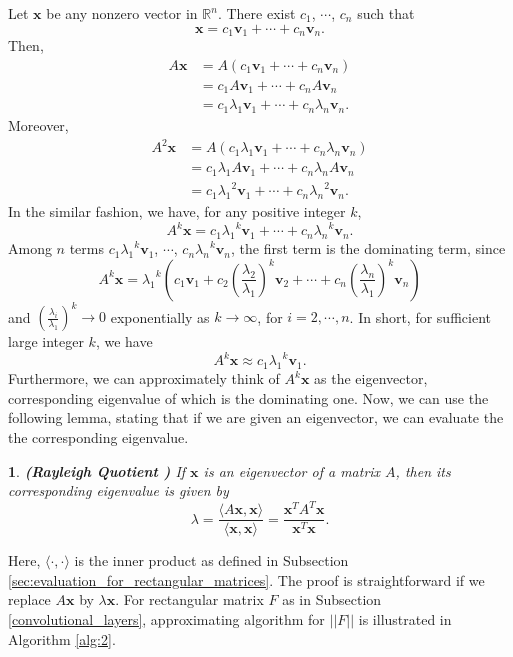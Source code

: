 \documentclass[12pt]{report}
\numberwithin{figure}{chapter}
\theoremstyle{plain}
\theoremstyle{definition}
\theoremstyle{corollary}
\theoremstyle{definition}
\theoremstyle{plain}
\theoremstyle{definition}
\theoremstyle{plain}
\newtheorem{lemma}[theorem]{\protect\lemmaname}
\providecommand{\lemmaname}{Lemma}
\newcommand\bx{\ensuremath{\boldsymbol x}}
\newcommand\bv{\ensuremath{\boldsymbol v}}
\begin{document}
Let \(\bx\) be any nonzero vector in \(\mathbb R^n\).
There exist \(c_1\), \(\cdots\), \(c_n\) such that
\[\bx=c_1\bv_1+\cdots+c_n\bv_n.\]
Then,
\begin{align*}
A\bx
&=A(c_1\bv_1+\cdots+c_n\bv_n)\\
&=c_1A\bv_1+\cdots+c_nA\bv_n\\
&=c_1\lambda_1\bv_1+\cdots+c_n\lambda_n\bv_n.
\end{align*}
Moreover,
\begin{align*}
A^2\bx
&=A(c_1\lambda_1\bv_1+\cdots+c_n\lambda_n\bv_n)\\
&=c_1\lambda_1A\bv_1+\cdots+c_n\lambda_nA\bv_n\\
&=c_1{\lambda_1}^2\bv_1+\cdots+c_n{\lambda_n}^2\bv_n.
\end{align*}
In the similar fashion, we have, for any positive integer \(k\),
\[A^k\bx=c_1{\lambda_1}^k\bv_1+\cdots+c_n{\lambda_n}^k\bv_n.\]
Among \(n\) terms \(c_1{\lambda_1}^k\bv_1\), \(\cdots\), \(c_n{\lambda_n}^k\bv_n\), the first term is the dominating term, since
\[A^k\bx={\lambda_1}^k\left(c_1\bv_1+c_2\left(\frac{\lambda_2}{\lambda_1}\right)^k\bv_2+\cdots+c_n\left(\frac{\lambda_n}{\lambda_1}\right)^k\bv_n\right)\]
and
\(\left(\frac{\lambda_i}{\lambda_1}\right)^k\to0\) exponentially as \(k\to\infty\), for \(i=2,\cdots,n\).
In short, for sufficient large integer \(k\), we have
\[A^k\bx\approx c_1{\lambda_1}^k\bv_1.\]
Furthermore, we can approximately think of \(A^k\bx\) as the eigenvector, corresponding eigenvalue of which is the dominating one.
Now, we can use the following lemma, stating that if we are given an eigenvector, we can evaluate the the corresponding eigenvalue.
\begin{lemma}\label{lemm:Rayleigh}
\textbf{(Rayleigh Quotient \cite{LR})}
If \(\bx\) is an eigenvector of a matrix \(A\), then its corresponding eigenvalue is given by
\[\lambda = \frac{\langle A\bx,\bx\rangle}{\langle \bx,\bx\rangle}=\frac{\bx^TA^T\bx}{\bx^T\bx}.\]
\end{lemma}

Here, \(\langle\cdot,\cdot\rangle\) is the inner product as defined in Subsection \ref{sec:evaluation_for_rectangular_matrices}.
The proof is straightforward if we replace \(A\bx\) by \(\lambda\bx\).
For rectangular matrix \(F\) as in Subsection \ref{convolutional_layers}, approximating algorithm for \(||F||\) is illustrated in Algorithm \ref{alg:2}.

\end{document}
